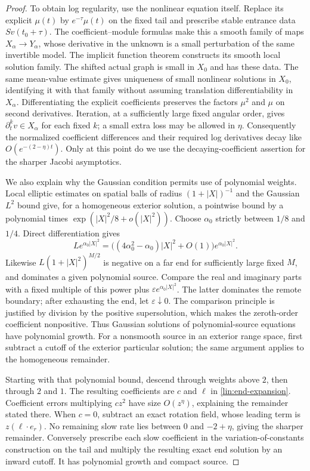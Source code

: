 \begin{proof}
To obtain log regularity, use the nonlinear equation itself.  Replace
its explicit $\mu(t)$ by $e^{-\tau}\mu(t)$ on the fixed tail and
prescribe stable entrance data $Sv(t_0+\tau)$.
The coefficient--module formulas make this a smooth family of maps
$X_\alpha\to Y_\alpha$, whose derivative in the unknown is a
small perturbation of the same invertible model.  The implicit function theorem
constructs its smooth local solution family.  The shifted actual graph
is small in $X_0$ and has these data.  The same mean-value estimate
gives uniqueness of small nonlinear solutions in $X_0$, identifying
it with that family without assuming translation differentiability
in $X_\alpha$.  Differentiating the explicit coefficients preserves
the factors $\mu^2$ and $\mu$ on second derivatives.  Iteration,
at a sufficiently large fixed angular order, gives
$\partial_t^k v\in X_\alpha$ for each fixed $k$; a small extra loss
may be allowed in $\eta$.  Consequently the normalized coefficient
differences and their required log derivatives decay like
$O(e^{-(2-\eta)t})$.  Only at this point do we use the
decaying-coefficient assertion for the sharper Jacobi asymptotics.

We also explain why the Gaussian condition permits use of polynomial
weights.  Local elliptic estimates on spatial balls of radius
$(1+|X|)^{-1}$ and the Gaussian $L^2$ bound give, for a homogeneous
exterior solution, a pointwise bound by a polynomial times
$\exp(|X|^2/8+o(|X|^2))$.  Choose $\alpha_0$ strictly between $1/8$
and $1/4$.  Direct differentiation gives
\[
 L e^{\alpha_0|X|^2}
  =\bigl((4\alpha_0^2-\alpha_0)|X|^2+O(1)\bigr)
                  e^{\alpha_0|X|^2}.
\]
Likewise $L(1+|X|^2)^{M/2}$ is negative on a far end for sufficiently
large fixed $M$, and dominates a given polynomial source.  Compare
the real and imaginary parts with a fixed multiple of this power plus
$\varepsilon e^{\alpha_0|X|^2}$.  The latter dominates the remote
boundary; after exhausting the end, let $\varepsilon\downarrow0$.
The comparison principle is justified by division by the positive
supersolution, which makes the zeroth-order coefficient nonpositive.
Thus Gaussian solutions of polynomial-source equations have polynomial
growth.  For a nonsmooth source in an exterior range space, first
subtract a cutoff of the exterior particular solution; the same
argument applies to the homogeneous remainder.

Starting with that polynomial bound, descend through weights above $2$,
then through $2$ and $1$.  The resulting coefficients are $c$ and
$\ell$ in \eqref{lin:end-expansion}.  Coefficient errors multiplying
$cz^2$ have size $O(z^\eta)$, explaining the remainder stated there.
When $c=0$, subtract an exact rotation field, whose leading term is
$z(\ell\cdot e_r)$.  No remaining slow rate lies between $0$ and
$-2+\eta$, giving the sharper remainder.  Conversely prescribe each
slow coefficient in the variation-of-constants construction on the
tail and multiply the resulting exact end solution by an inward
cutoff.  It has polynomial growth and compact source.


\end{proof}
